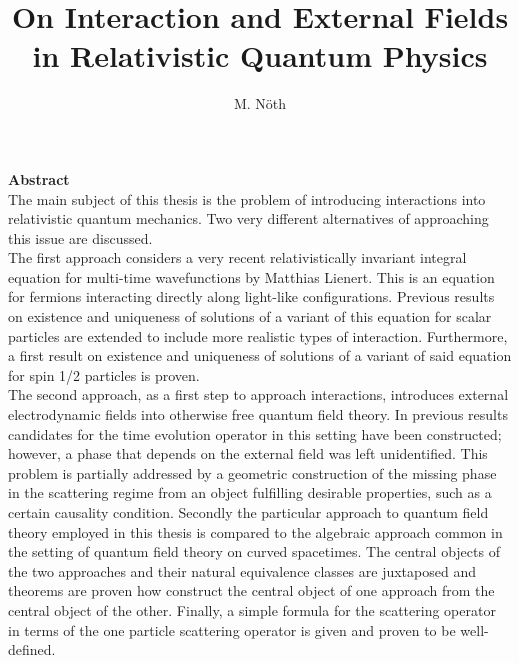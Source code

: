 \documentclass[b5paper,draft,openbib,12pt]{memoir}
\begin{document}
\frontmatter

\title{On Interaction and External Fields in Relativistic Quantum Physics}
\author{M. Nöth}
\maketitle



\newpage 
{\large \textbf{Abstract}}\\
The main subject of this thesis is the problem 
of introducing interactions 
into relativistic quantum mechanics. Two very different 
alternatives of 
approaching this issue are discussed.\\ 

The first approach considers a very recent relativistically invariant 
integral equation for multi-time wavefunctions 
by Matthias Lienert. This is an 
equation for fermions interacting directly along light-like 
configurations. Previous 
results on existence and uniqueness of solutions of a variant of 
this equation for scalar particles  
are extended to include more realistic types of interaction. 
Furthermore,
a first result on existence and uniqueness of solutions of a 
variant of said equation for spin 1/2 particles is proven. \\

The second approach, as a first step to approach interactions, 
introduces external electrodynamic fields into otherwise free 
quantum field theory. In previous results candidates for 
the time evolution operator in this setting have been constructed;
however, a phase that depends on the external field was left 
unidentified. This problem is partially addressed by a geometric 
construction of the missing phase in the scattering 
regime from an object fulfilling 
desirable properties, such as a certain causality condition. 
Secondly the particular approach to quantum field theory employed
in this thesis is compared to the algebraic approach common in 
the setting of quantum field theory on curved spacetimes. The 
central objects of the two approaches and their natural 
equivalence classes are juxtaposed and theorems are proven 
how construct the central object of one approach from the
central object of the other. 
Finally, a simple formula for the  
scattering operator in terms of the one particle 
scattering operator is given and proven to be well-defined.  

\newpage
\end{document}
